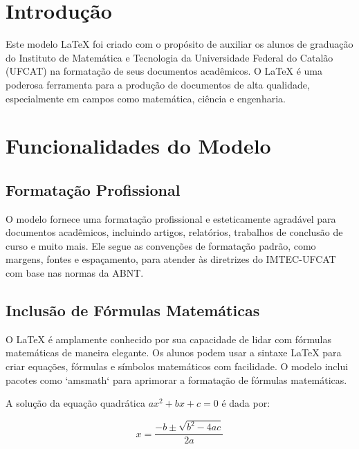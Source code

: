 \documentclass[
	article,			%
	11pt,				%
	oneside,			%
	a4paper,			%
	chapter=TITLE,
	english,			%
	brazil,				%
	sumario=tradicional
	]{templateimtec}
\begin{document}

\section{Introdução}

Este modelo LaTeX foi criado com o propósito de auxiliar os alunos de graduação do Instituto de Matemática e Tecnologia da Universidade Federal do Catalão (UFCAT) na formatação de seus documentos acadêmicos. O LaTeX é uma poderosa ferramenta para a produção de documentos de alta qualidade, especialmente em campos como matemática, ciência e engenharia.



\section{Funcionalidades do Modelo}

\subsection{Formatação Profissional}

O modelo fornece uma formatação profissional e esteticamente agradável para documentos acadêmicos, incluindo artigos, relatórios, trabalhos de conclusão de curso e muito mais. Ele segue as convenções de formatação padrão, como margens, fontes e espaçamento, para atender às diretrizes do IMTEC-UFCAT com base nas normas da ABNT.

\subsection{Inclusão de Fórmulas Matemáticas}

O LaTeX é amplamente conhecido por sua capacidade de lidar com fórmulas matemáticas de maneira elegante. Os alunos podem usar a sintaxe LaTeX para criar equações, fórmulas e símbolos matemáticos com facilidade. O modelo inclui pacotes como `amsmath` para aprimorar a formatação de fórmulas matemáticas.

\begin{exemplo}
	A solução da equação quadrática \(ax^2 + bx + c = 0\) é dada por:
	
	\[
		x = \frac{-b \pm \sqrt{b^2 - 4ac}}{2a}
	\]
\end{exemplo}
\end{document}
